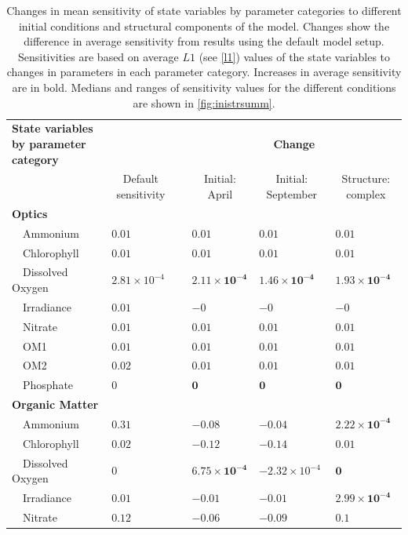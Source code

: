\documentclass[letterpaper,12pt,oneside]{article}\usepackage[]{graphicx}\usepackage[]{color}
\begin{document}
\begin{table}[!tbp]
{\scriptsize
\caption{Changes in mean sensitivity of state variables by parameter categories to different initial conditions and structural components of the model.  Changes show the difference in average sensitivity from results using the default model setup. Sensitivities are based on average $L1$ (see \cref{l1}) values of the state variables to changes in parameters in each parameter category. Increases in average sensitivity are in bold. Medians and ranges of sensitivity values for the different conditions are shown in \cref{fig:inistrsumm}.\label{tab:inistrchg}} 
\begin{center}
\begin{tabular}{llclll}
\hline\hline
\multicolumn{1}{l}{\bfseries State variables by parameter category}&\multicolumn{1}{c}{\bfseries }&\multicolumn{1}{c}{\bfseries }&\multicolumn{3}{c}{\bfseries Change}\tabularnewline
\cline{4-6}
\multicolumn{1}{l}{}&\multicolumn{1}{c}{Default sensitivity}&\multicolumn{1}{c}{}&\multicolumn{1}{c}{Initial: April}&\multicolumn{1}{c}{Initial: September}&\multicolumn{1}{c}{Structure: complex}\tabularnewline
\hline
{\bfseries Optics}&&&&&\tabularnewline
~~Ammonium&$0.01$&&$\bm{0.01}$&$\bm{0.01}$&$\bm{0.01}$\tabularnewline
~~Chlorophyll&$0.01$&&$\bm{0.01}$&$\bm{0.01}$&$\bm{0.01}$\tabularnewline
~~Dissolved Oxygen&$2.81\times 10^{-4}$&&$\bm{2.11\times 10^{-4}}$&$\bm{1.46\times 10^{-4}}$&$\bm{1.93\times 10^{-4}}$\tabularnewline
~~Irradiance&$0.01$&&$-0$&$-0$&$-0$\tabularnewline
~~Nitrate&$0.01$&&$\bm{0.01}$&$\bm{0.01}$&$\bm{0.01}$\tabularnewline
~~OM1&$0.01$&&$\bm{0.01}$&$\bm{0.01}$&$\bm{0.01}$\tabularnewline
~~OM2&$0.02$&&$\bm{0.01}$&$\bm{0.01}$&$\bm{0.01}$\tabularnewline
~~Phosphate&$0$&&$\bm{0}$&$\bm{0}$&$\bm{0}$\tabularnewline
\hline
{\bfseries Organic Matter}&&&&&\tabularnewline
~~Ammonium&$0.31$&&$-0.08$&$-0.04$&$\bm{2.22\times 10^{-4}}$\tabularnewline
~~Chlorophyll&$0.02$&&$-0.12$&$-0.14$&$\bm{0.01}$\tabularnewline
~~Dissolved Oxygen&$0$&&$\bm{6.75\times 10^{-4}}$&$-2.32\times 10^{-4}$&$\bm{0}$\tabularnewline
~~Irradiance&$0.01$&&$-0.01$&$-0.01$&$\bm{2.99\times 10^{-4}}$\tabularnewline
~~Nitrate&$0.12$&&$-0.06$&$-0.09$&$\bm{0.1}$\tabularnewline

\end{tabular}
\end{center}}
\end{table}
\end{document}
